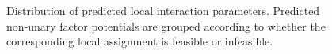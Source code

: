 \begin{figure}[t]
\caption{Distribution of predicted local interaction parameters. Predicted non-unary factor potentials are grouped according to whether the corresponding local assignment is feasible or infeasible.}
\label{fig:inference_theta_distribution}
\end{figure}
